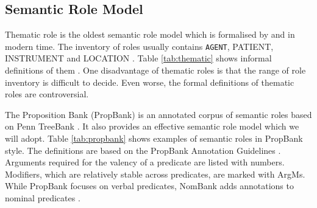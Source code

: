 \documentclass[a4paper]{article}
\begin{document}
\subsection{Semantic Role Model} \label{sec:semanticrole}
Thematic role is the oldest semantic role model which is formalised by \citet{gruber1965studies} and \citet{fillmore1968case} in modern time. The inventory of roles usually contains \texttt{AGENT}, PATIENT, INSTRUMENT and LOCATION \citep{aarts2013english}. Table \ref{tab:thematic} shows informal definitions of them \citep{jurafsky2014speech}. One disadvantage of thematic roles is that the range of role inventory is difficult to decide. Even worse, the formal definitions of thematic roles are controversial. 

The Proposition Bank (PropBank) is an annotated corpus of semantic roles based on Penn TreeBank \citep{palmer2005proposition}. It also provides an effective semantic role model which we will adopt. Table \ref{tab:propbank} shows examples of semantic roles in PropBank style. The definitions are based on the PropBank Annotation Guidelines \citep{bonial2010propbank}. Arguments required for the valency of a predicate are listed with numbers. Modifiers, which are relatively stable across predicates, are marked with ArgMs. While PropBank focuses on verbal predicates, NomBank adds annotations to nominal predicates \citep{meyers2004nombank}. 
\end{document}
